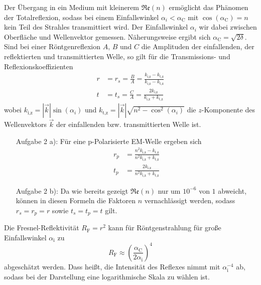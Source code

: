 Der Übergang in ein Medium mit kleinerem $\mathfrak{Re}(n)$ ermöglicht das Phänomen der 
Totalreflexion, sodass bei einem Einfallswinkel $\alpha_i < \alpha_\text{C}$ mit 
$\cos(\alpha_\text{C})=n$ kein Teil des Strahles transmittiert wird. Der 
Einfallswinkel $\alpha_i$ wir dabei zwischen Oberfläche und Wellenvektor gemessen. 
Näherungsweise ergibt sich $\alpha_\text{C}=\sqrt{2\delta}$.\\
Sind bei einer Röntgenreflexion $A$, $B$ und $C$ die Amplituden der 
einfallenden, der reflektierten und transmittierten Welle, so gilt für die 
Transmissions- und Reflexionskoeffizienten
\begin{align}
r&=r_s=\frac{B}{A}=\frac{k_\text{i,z}-k_\text{t,z}}{k_\text{i,z}-k_\text{t,z}} \label{eq:r} \\
t&=t_s=\frac{C}{A}= \frac{2 k_\text{i,z}}{k_\text{i,z}+k_\text{t,z}}
\end{align}
wobei $k_\text{i,z}=|\vec{k}|\sin(\alpha_i)$ und $k_\text{t,z}=|
\vec{k}|\sqrt{n^2-\cos^2(\alpha_i)}$ die $z$-Komponente des 
Wellenvektors 
$\vec{k}$ der einfallenden 
bzw. transmittierten Welle ist.
\begin{itemize}
\item[Aufgabe 2 a):] 
Für eine p-Polarisierte EM-Welle ergeben sich 
\begin{align}
r_p&= \frac{n^2 k_\text{i,z}-k_\text{t,z}}{n^2 k_\text{i,z}+k_\text{t,z}} \\
t_p&=\frac{2k_\text{i,z}}{n^2 k_\text{i,z}+k_\text{t,z}}
\end{align}
\item[Aufgabe 2 b):]
Da wie bereits gezeigt $\mathfrak{Re}(n)$ nur um $10^{-6}$ von $1$ abweicht, können in 
diesen Formeln die Faktoren $n$ vernachlässigt werden, sodass $r_s=r_p=r$ sowie 
$t_s=t_p=t$ gilt.
\end{itemize}
Die Fresnel-Reflektivität $R_\text{F}=r^2$ kann für Röntgenstrahlung für große 
Einfallswinkel $\alpha_\text{i}$ zu 
\begin{equation}
R_\text{F}\approx \left( \frac{\alpha_\text{C}}{2\alpha_\text{i}} \right)^4 \label{eq:Reflekt4}
\end{equation}
abgeschätzt werden. Dass heißt, die Intensität des Reflexes nimmt mit 
$\alpha_\text{i}^{-4}$ ab, sodass bei der Darstellung eine logarithmische Skala 
zu wählen ist.
